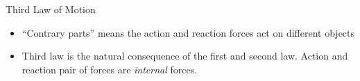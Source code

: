 \documentclass[12pt,compress,aspectratio=169]{beamer}
\newcommand{\mb}[1]{\ensuremath\mathbf{#1}}
\newcommand{\eq}[2]{\vspace{#1}{\Large\begin{displaymath}#2\end{displaymath}}}
\begin{document}
\begin{frame}{Third Law of Motion}
  \begin{center}
  \end{center}

  \eq{-.2in}{
    \boxed{\mb{F}_{\text{AB}} = -\mb{F}_{\text{BA}}}
  }
  \begin{itemize}
  \item ``Contrary parts'' means the action and reaction forces act on
    different objects
  \item Third law is the natural consequence of the first and second law.
    Action and reaction pair of forces are \emph{internal} forces.
  \end{itemize}
  \vspace{.2in}
\end{frame}


%  
\end{document}
